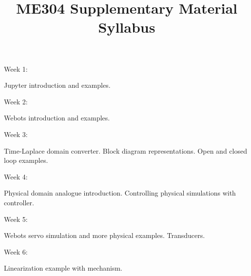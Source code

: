 \documentclass[12pt]{article}
\title{ME304 Supplementary Material Syllabus}
\begin{document}
\maketitle

Week 1:

Jupyter introduction and examples.

Week 2:

Webots introduction and examples.

Week 3:

Time-Laplace domain converter. Block diagram representations.
Open and closed loop examples.

Week 4:

Physical domain analogue introduction. Controlling physical simulations with controller.

Week 5:

Webots servo simulation and more physical examples. Transducers.

Week 6:

Linearization example with mechanism. 
\end{document}
